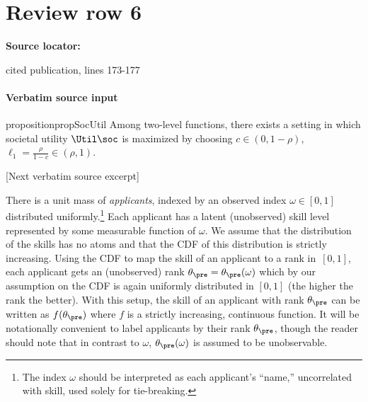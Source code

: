 \documentclass[10pt]{article}
\begin{document}
\section*{Review row 6}
\textbf{Source locator:} {\footnotesize\raggedright cited publication, lines 173-\allowbreak{}177\par}
\paragraph{Verbatim source input}
\begin{ReviewVerbatim}
\begin{restatable}{proposition}{propSocUtil}
	Among two-level functions, there exists a setting in which societal utility $\Util\soc$ is maximized by choosing $c \in(0, 1-\rho)$, $\ell_1 = \frac{\rho}{1-c} \in (\rho,1)$.
\label{prop:SocUtil}
\end{restatable}

[Next verbatim source excerpt]

There is a unit mass of \textit{applicants}, indexed by an observed index $\omega \in [0,1]$ distributed uniformly.\footnote{The index $\omega$ should be interpreted as each applicant's ``name,'' uncorrelated with skill, used solely for tie-breaking.}  Each applicant has a latent (unobserved) skill level represented by some measurable function of $\omega$.
We assume that {the distribution of the skills} has no atoms and that the CDF of this distribution is strictly increasing.
Using the CDF to map the skill of an applicant to a rank in~$[0,1]$, each applicant gets an (unobserved) rank $\theta_\pre =\theta_\pre(\omega)$ which by our assumption on the CDF is again uniformly distributed in $[0, 1]$ (the higher the rank the better).  With this setup, the skill of an applicant with rank $\theta_\pre$ can be written as $f(\theta_\pre)$ where $f$ is a strictly increasing, continuous function.  {It will be notationally convenient to label applicants by their rank $\theta_\pre$, though the reader should note that in contrast to $\omega$, $\theta_\pre(\omega)$ is assumed to be unobservable.}




\end{ReviewVerbatim}
\end{document}
